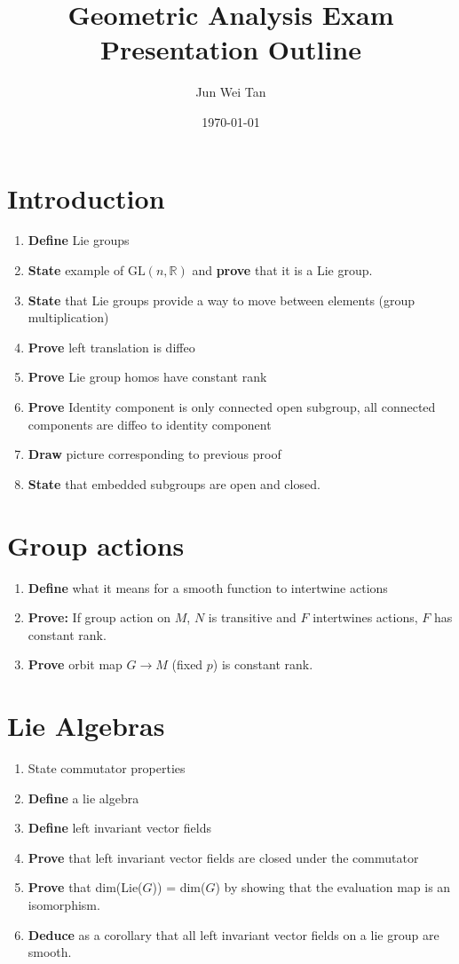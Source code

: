 \documentclass[prb,12pt]{revtex4-2}
\theoremstyle{definition}
\theoremstyle{definition}
\newcommand{\R}{\mathbb{R}}
\begin{document}
\title{Geometric Analysis Exam Presentation Outline}
	\author{Jun Wei Tan}
	\date{\today}
	\maketitle
\section{Introduction}
\begin{enumerate}
	\item \textbf{Define} Lie groups
	\item \textbf{State} example of $\text{GL}(n,\R)$ and \textbf{prove} that it is a Lie group.
	\item \textbf{State} that Lie groups provide a way to move between elements (group multiplication)
	\item \textbf{Prove} left translation is diffeo
	\item \textbf{Prove} Lie group homos have constant rank
	\item \textbf{Prove} Identity component is only connected open subgroup, all connected components are diffeo to identity component
	\item \textbf{Draw} picture corresponding to previous proof
	\item \textbf{State} that embedded subgroups are open and closed. 
\end{enumerate}
\section{Group actions}
\begin{enumerate}[resume]
	\item \textbf{Define} what it means for a smooth function to intertwine actions
	\item \textbf{Prove:} If group action on $M$, $N$ is transitive and $F$ intertwines actions, $F$ has constant rank.
	\item \textbf{Prove} orbit map $G\to M$ (fixed $p$) is constant rank.
\end{enumerate}
\section{Lie Algebras}
\begin{enumerate}[resume]
	\item State commutator properties
		\item \textbf{Define} a lie algebra
	\item \textbf{Define} left invariant vector fields
	\item \textbf{Prove} that left invariant vector fields are closed under the commutator
	\item \textbf{Prove} that dim(Lie($G$)) = dim($G$) by showing that the evaluation map is an isomorphism.
	\item \textbf{Deduce} as a corollary that all left invariant vector fields on a lie group are smooth.
\end{enumerate}
\end{document}
